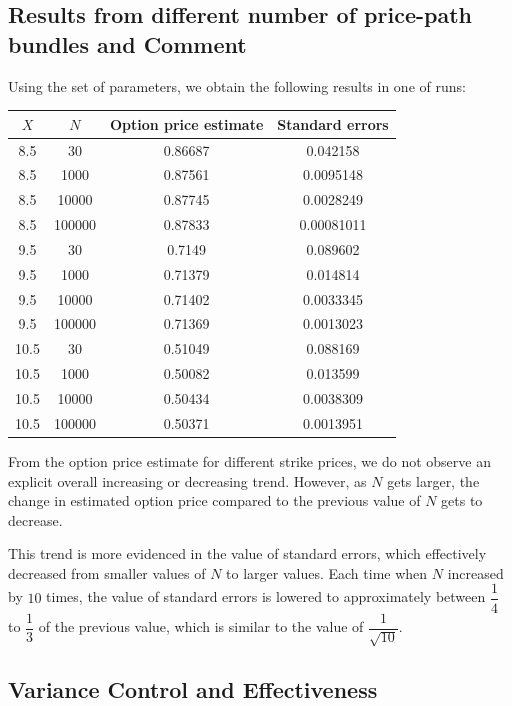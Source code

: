 \subsection{Results from different number of price-path bundles and Comment}

Using the set of parameters, we obtain the following results in one of runs:

\begin{center}
	\begin{tabular}{| c | c | c | c |}
		\hline $X$ & $N$ & Option price estimate & Standard errors\\
		[0.5ex]
		\hline 8.5 & 30 & 0.86687 & 0.042158\\
		\hline 8.5 & 1000 & 0.87561 & 0.0095148\\
		\hline 8.5 & 10000 & 0.87745 & 0.0028249\\
		\hline 8.5 & 100000 & 0.87833 & 0.00081011\\
		\hline
		\hline 9.5 & 30 & 0.7149 & 0.089602\\
		\hline 9.5 & 1000 & 0.71379 & 0.014814\\
		\hline 9.5 & 10000 & 0.71402 & 0.0033345\\
		\hline 9.5 & 100000 & 0.71369 & 0.0013023\\
		\hline
		\hline 10.5 & 30 & 0.51049 & 0.088169\\
		\hline 10.5 & 1000 & 0.50082 & 0.013599\\
		\hline 10.5 & 10000 & 0.50434 & 0.0038309\\
		\hline 10.5 & 100000 & 0.50371 & 0.0013951\\
		\hline
	\end{tabular}
\end{center}

From the option price estimate for different strike prices, we do not observe an explicit overall increasing or decreasing trend. However, as $N$ gets larger, the change in estimated option price compared to the previous value of $N$ gets to decrease. 

This trend is more evidenced in the value of standard errors, which effectively decreased from smaller values of $N$ to larger values. Each time when $N$ increased by $10$ times, the value of standard errors is lowered to approximately between $\dfrac{1}{4}$ to $\dfrac{1}{3}$ of the previous value, which is similar to the value of $\dfrac{1}{\sqrt{10}}$.


\subsection{Variance Control and Effectiveness}


